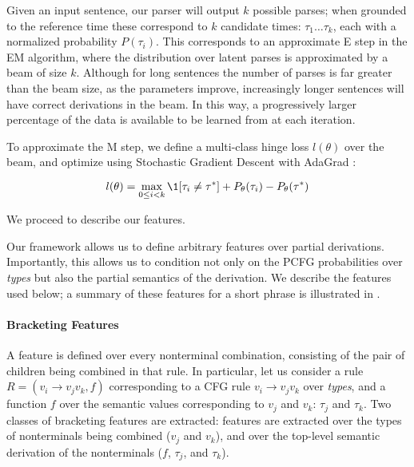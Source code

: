 Given an input sentence, our parser will output $k$ possible parses; when
  grounded to the reference time these correspond to $k$ candidate times:
  $\tau_1 \dots \tau_k$, each with a normalized probability $P(\tau_i)$.
This corresponds to an approximate E step in the EM algorithm, where the
  distribution over latent parses is approximated by a beam of size $k$.
Although for long sentences the number of parses is far greater than the
  beam size, as the parameters improve, increasingly longer sentences will
  have correct derivations in the beam.
In this way, a progressively larger percentage of the data is available to be
	learned from at each iteration.

To approximate the M step, 
  we define a multi-class hinge loss $l(\theta)$ over the beam, and
  optimize using Stochastic Gradient Descent with AdaGrad
  \cite{key:2010duchi-adagrad}:

\begin{equation}
l(\theta) = 
  \max_{0 \leq i < k} \1[\tau_i \neq \tau^*] + P_\theta(\tau_i)
                                                 - P_\theta(\tau^*)
\end{equation}

We proceed to describe our features.


Our framework allows us to define arbitrary features over partial derivations.
Importantly, this allows us to condition not only on the PCFG probabilities
  over \textit{types} but also the partial semantics of the
  derivation.
We describe the features used below; a summary of these features
  for a short phrase is illustrated in .

\paragraph{Bracketing Features}
A feature is defined over every nonterminal combination,
  consisting of the pair of children being combined in that rule.
In particular, let us consider a rule
  \mbox{$R = (v_i \rightarrow v_j v_k, f)$} corresponding to a CFG rule
  \mbox{$v_i \rightarrow v_j v_k$} over \textit{types}, and a function $f$
  over the semantic values corresponding to 
  $v_j$ and $v_k$: $\tau_j$ and $\tau_k$.
Two classes of bracketing features are extracted:
  features are extracted over the types of nonterminals being combined
    ($v_j$ and $v_k$),
  and over the top-level semantic derivation of the nonterminals
    ($f$, $\tau_j$, and $\tau_k$).

